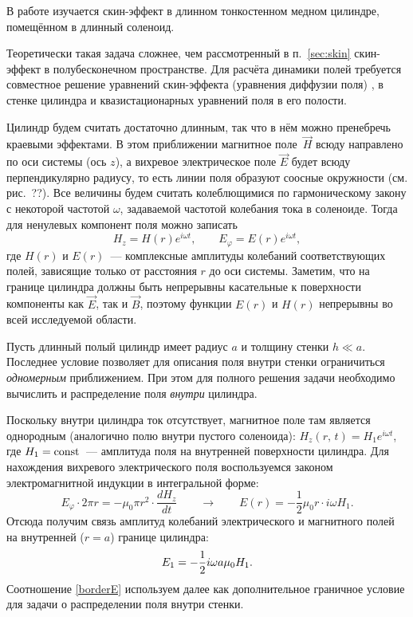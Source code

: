 


В работе изучается скин-эффект в длинном тонкостенном медном цилиндре, 
помещённом в длинный соленоид.

Теоретически такая задача сложнее,
чем рассмотренный в п.~\ref{sec:skin} скин-эффект в полубесконечном пространстве.
Для расчёта динамики полей требуется совместное решение уравнений
скин-эффекта (уравнения диффузии поля) ,
 в стенке цилиндра и квазистационарных 
уравнений поля в его полости.

Цилиндр будем считать достаточно длинным, так что в нём можно пренебречь
краевыми эффектами. 
В этом приближении магнитное поле~$\vec{H}$ всюду направлено
по оси системы (ось $z$), а вихревое электрическое поле $\vec{E}$ 
будет всюду перпендикулярно радиусу, то есть линии поля образуют соосные окружности
(см. рис.~??).
Все величины будем считать колеблющимися по гармоническому закону 
с некоторой частотой $\omega$, задаваемой частотой колебания тока
в соленоиде. Тогда для ненулевых компонент поля можно записать
\[
H_z = H(r) e^{i\omega t},\qquad E_{\varphi} = E(r) e^{i\omega t},
\]
где $H(r)$ и $E(r)$~--- комплексные амплитуды колебаний соответствующих полей, 
зависящие только от расстояния $r$ до оси системы.
Заметим, что на границе цилиндра должны быть непрерывны касательные
к поверхности компоненты как $\vec{E}$, так и $\vec{B}$, 
поэтому функции $E(r)$ и $H(r)$ непрерывны во всей исследуемой области.



Пусть длинный полый цилиндр имеет радиус $a$ и толщину стенки $h \ll a$. 
Последнее условие позволяет для описания поля внутри стенки
ограничиться \emph{одномерным} приближением. При этом для полного 
решения задачи необходимо вычислить и распределение поля \emph{внутри} цилиндра. 


Поскольку внутри цилиндра ток отсутствует, магнитное поле там является 
однородным (аналогично полю внутри пустого соленоида): 
$H_z(r,\,t)=H_1 e^{i\omega t}$, где $H_1=\mathrm{const}$~--- амплитуда поля на внутренней
поверхности цилиндра. Для нахождения вихревого электрического поля 
воспользуемся законом электромагнитной индукции  в интегральной
форме:
\[
E_{\varphi}\cdot 2\pi r = -\mu_0 \pi r^2 \cdot \frac{dH_z}{dt}\qquad
\to 
\qquad 
E(r) = -\frac12 \mu_0 r \cdot i\omega H_1.
\]
Отсюда получим связь амплитуд колебаний электрического и магнитного полей 
на внутренней ($r=a$) границе цилиндра:
\begin{equation}\eqmark{borderE}
E_1 = -\frac12  i\omega a\mu_0 H_1.
\end{equation}
Соотношение \eqref{borderE} используем далее как дополнительное граничное
условие для задачи о распределении поля внутри стенки.


